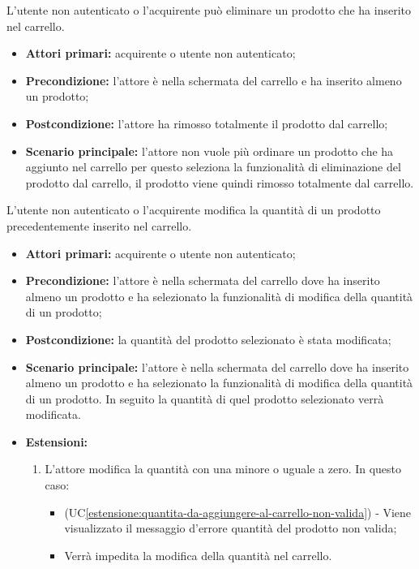 L'utente non autenticato o l'acquirente può eliminare un prodotto che ha inserito nel carrello.
\begin{itemize}
    \item \textbf{Attori primari:} acquirente o utente non autenticato;
    \item \textbf{Precondizione:} l'attore è nella schermata del carrello e ha inserito almeno un prodotto;
    \item \textbf{Postcondizione:} l'attore ha rimosso totalmente il prodotto dal carrello;
    \item \textbf{Scenario principale:} l'attore non vuole più ordinare un prodotto che ha aggiunto nel carrello per questo seleziona la funzionalità di eliminazione del prodotto dal carrello, il prodotto viene quindi rimosso totalmente dal carrello.
\end{itemize}


\label{modifica-quantita-nel-carrello}

L'utente non autenticato o l'acquirente modifica la quantità di un prodotto precedentemente inserito nel carrello.
\begin{itemize}
    \item \textbf{Attori primari:} acquirente o utente non autenticato;
    \item \textbf{Precondizione:} l'attore è nella schermata del carrello dove ha inserito almeno un prodotto e ha selezionato la funzionalità di modifica della quantità di un prodotto;
    \item \textbf{Postcondizione:} la quantità del prodotto selezionato è stata modificata;
    \item \textbf{Scenario principale:} l'attore è nella schermata del carrello dove ha inserito almeno un prodotto e ha selezionato la funzionalità di modifica della quantità di un prodotto. In seguito la quantità di quel prodotto selezionato verrà modificata.
    \item \textbf{Estensioni:}
    \begin{enumerate}[label=\lett]
        \item L'attore modifica la quantità con una minore o uguale a zero. In questo caso:
        \begin{itemize}
            \item (UC\ref{estensione:quantita-da-aggiungere-al-carrello-non-valida}) - Viene visualizzato il messaggio d'errore quantità del prodotto non valida;
            \item Verrà impedita la modifica della quantità nel carrello.
        \end{itemize}
    \end{enumerate}
\end{itemize}

